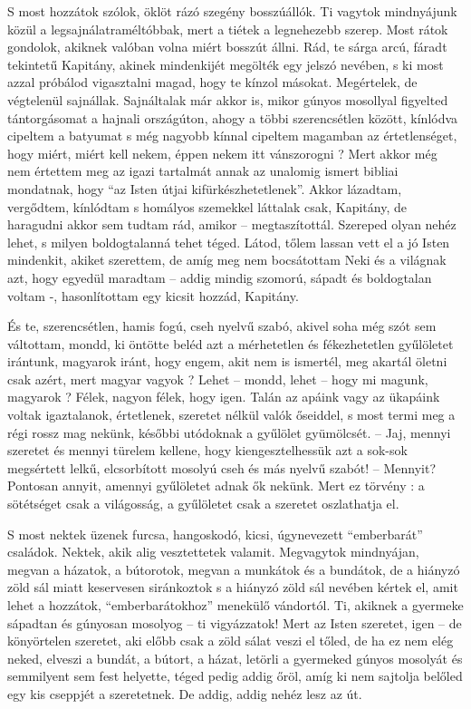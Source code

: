 \documentclass{IEEEtran}
\begin{document}
S most hozzátok szólok, öklöt rázó szegény bosszúállók. Ti vagytok mindnyájunk
közül a legsajnálatraméltóbbak, mert a tiétek a legnehezebb szerep. Most rátok
gondolok, akiknek valóban volna miért bosszút állni. Rád, te sárga arcú,
fáradt tekintetű Kapitány, akinek mindenkijét megölték egy jelszó nevében, s
ki most azzal próbálod vigasztalni magad, hogy te kínzol másokat. Megértelek,
de végtelenül sajnállak. Sajnáltalak már akkor is, mikor gúnyos mosollyal
figyelted tántorgásomat a hajnali országúton, ahogy a többi szerencsétlen
között, kínlódva cipeltem a batyumat s még nagyobb kínnal cipeltem magamban az
értetlenséget, hogy miért, miért kell nekem, éppen nekem itt vánszorogni ?
Mert akkor még nem értettem meg az igazi tartalmát annak az unalomig ismert
bibliai mondatnak, hogy “az Isten útjai kifürkészhetetlenek”. Akkor lázadtam,
vergődtem, kínlódtam s homályos szemekkel láttalak csak, Kapitány, de
haragudni akkor sem tudtam rád, amikor – megtaszítottál. Szereped olyan nehéz
lehet, s milyen boldogtalanná tehet téged. Látod, tőlem lassan vett el a jó
Isten mindenkit, akiket szerettem, de amíg meg nem bocsátottam Neki és a
világnak azt, hogy egyedül maradtam – addig mindig szomorú, sápadt és
boldogtalan voltam -, hasonlítottam egy kicsit hozzád, Kapitány.

És te, szerencsétlen, hamis fogú, cseh nyelvű szabó, akivel soha még szót sem
váltottam, mondd, ki öntötte beléd azt a mérhetetlen és fékezhetetlen
gyűlöletet irántunk, magyarok iránt, hogy engem, akit nem is ismertél, meg
akartál öletni csak azért, mert magyar vagyok ? Lehet – mondd, lehet – hogy mi
magunk, magyarok ? Félek, nagyon félek, hogy igen. Talán az apáink vagy az
ükapáink voltak igaztalanok, értetlenek, szeretet nélkül valók őseiddel, s
most termi meg a régi rossz mag nekünk, későbbi utódoknak a gyűlölet
gyümölcsét. – Jaj, mennyi szeretet és mennyi türelem kellene, hogy
kiengesztelhessük azt a sok-sok megsértett lelkű, elcsorbított mosolyú cseh és
más nyelvű szabót! – Mennyit? Pontosan annyit, amennyi gyűlöletet adnak ők
nekünk. Mert ez törvény : a sötétséget csak a világosság, a gyűlöletet csak a
szeretet oszlathatja el.

S most nektek üzenek furcsa, hangoskodó, kicsi, úgynevezett “emberbarát”
családok. Nektek, akik alig vesztettetek valamit. Megvagytok mindnyájan,
megvan a házatok, a bútorotok, megvan a munkátok és a bundátok, de a hiányzó
zöld sál miatt keservesen siránkoztok s a hiányzó zöld sál nevében kértek el,
amit lehet a hozzátok, “emberbarátokhoz” menekülő vándortól. Ti, akiknek a
gyermeke sápadtan és gúnyosan mosolyog – ti vigyázzatok! Mert az Isten
szeretet, igen – de könyörtelen szeretet, aki előbb csak a zöld sálat veszi el
tőled, de ha ez nem elég neked, elveszi a bundát, a bútort, a házat, letörli a
gyermeked gúnyos mosolyát és semmilyent sem fest helyette, téged pedig addig
őröl, amíg ki nem sajtolja belőled egy kis cseppjét a szeretetnek. De addig,
addig nehéz lesz az út.
\end{document}
